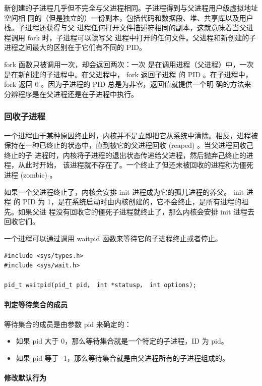 新创建的子进程几乎但不完全与父进程相同。子进程得到与父进程用户级虚拟地址空间相
同的（但是独立的）一份副本，包括代码和数据段、堆、共享库以及用户栈。子进程还获得与父
进程任何打开文件描述符相同的副本，这就意味着当父进程调用 fork 时，子进程可以读写父
进程中打开的任何文件。父进程和新创建的子进程之间最大的区别在于它们有不同的 PID。

fork 函数只被调用一次，却会返回两次：一次
是在调用进程（父进程）中，一次是在新创建的子进程中。在父进程中， fork 返回子进程
的 PID 。在子进程中， fork 返回 0 。因为子进程的 PID 总是为非零，返回值就提供一个明
确的方法来分辨程序是在父进程还是在子进程中执行。

\subsubsection{回收子进程}

一个进程由于某种原因终止时，内核并不是立即把它从系统中清除。相反，进程被
保持在一种已终止的状态中，直到被它的父进程回收 (reaped) 。当父进程回收己终止的子
进程时，内核将子进程的退出状态传递给父进程，然后抛弃己终止的进程，从此时开始，
该进程就不存在了。一个终止了但还未被回收的进程称为僵死进程 (zombie) 。

如果一个父进程终止了，内核会安排 init 进程成为它的孤儿进程的养父。 init 进程
的 PID 为 1，是在系统启动时由内核创建的，它不会终止，是所有进程的祖先。如果父进
程没有回收它的僵死子进程就终止了，那么内核会安排 init 进程去回收它们。

一个进程可以通过调用 waitpid 函数来等待它的子进程终止或者停止。

\begin{lstlisting}[style=CStyle]
#include <sys/types.h>
#include <sys/wait.h>

pid_t waitpid(pid_t pid， int *statusp， int options);
\end{lstlisting}

\paragraph{判定等待集合的成员}

等待集合的成员是由参数 pid 来确定的：
\begin{itemize}
    \item 如果 pid 大于 0，那么等待集合就是一个特定的子进程，ID 为 pid。
    \item 如果 pid 等于 -1，那么等待集合就是由父进程所有的子进程组成的。
\end{itemize}

\paragraph{修改默认行为}

